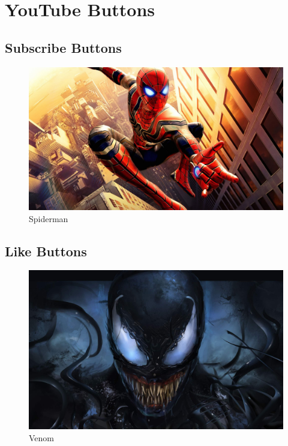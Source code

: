 \chapter{YouTube Buttons}

\section{Subscribe Buttons}


\begin{figure}[h]
    \centering
    \includegraphics[width = \textwidth ]{images/a}
    \caption{Spiderman}
    \label{spidey}
\end{figure}

\section{Like Buttons}

\begin{figure}[H]
    \centering
    \includegraphics[width = \textwidth ]{images/b}
    \caption{Venom}
    \label{ve}
\end{figure}


